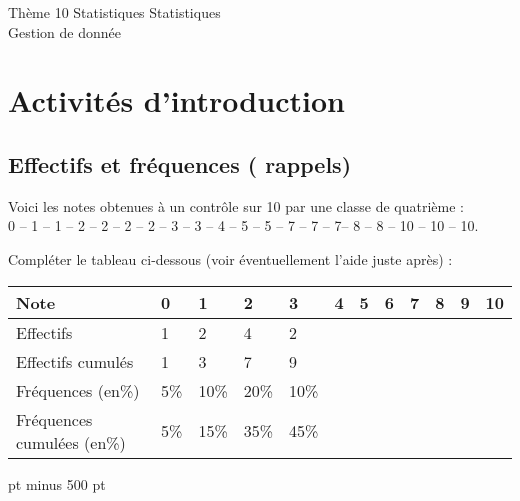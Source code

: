 \documentclass[10pt]{article}
\begin{document}
\begin{encadrementombre}{Thème 10 Statistiques}
{\LARGE Statistiques}\\

{\Large Gestion de donnée}
\end{encadrementombre}



{\setlength{\baselineskip}{1.5\baselineskip}


\section{Activités d'introduction}
\subsection{Effectifs et fréquences ( rappels)}
Voici les notes obtenues à un contrôle sur 10 par une classe de quatrième :\\
0 -- 1 -- 1 -- 2 -- 2 -- 2 -- 2 -- 3 -- 3 -- 4 -- 5 -- 5 -- 7 -- 7 -- 7--
8 -- 8 -- 10 -- 10 -- 10.

Compléter le tableau ci-dessous (voir éventuellement l'aide juste après) :\\
\strut{}%
\begin{tabular}{|p{4.2cm}*{11}{|p{5mm}}|}
\hline
Note
&
0 & 1 & 2& 3 & 4 & 5 & 6&7 &8 &9 &10 \\
\hline\hline
Effectifs
&
1 & 2 & 4&2 &&&& & && \\
\hline
Effectifs cumulés
&
1 & 3 & 7& 9&  & & & &
	 & & \\
\hline
Fréquences (en\%)
&
5\% & 10\% & 20\% & 10\% &  & & & & & & \\
\hline
Fréquences cumulées (en\%)
&
5\% & 15\% & 35\% & 45\% &  & & & & & & \\
\hline
\end{tabular} pt minus 500 pt

}
\end{document}
